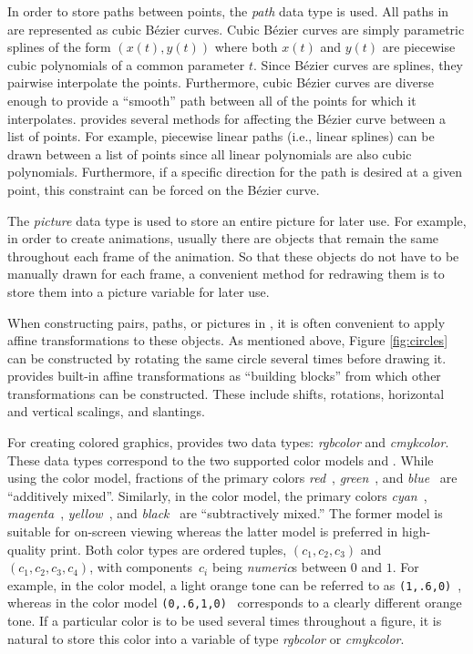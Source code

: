 In order to store paths between points, the \textit{path} data type is
used.  All paths in \MP{} are represented as cubic B\'{e}zier curves.
Cubic B\'{e}zier curves are simply parametric splines of the form
$(x(t),y(t))$ where both $x(t)$ and $y(t)$ are piecewise cubic
polynomials of a common parameter $t$.  Since B\'{e}zier curves are
splines, they pairwise interpolate the points.  Furthermore, cubic
B\'{e}zier curves are diverse enough to provide a ``smooth'' path
between all of the points for which it interpolates.  \MP{} provides
several methods for affecting the B\'{e}zier curve between a list of
points.  For example, piecewise linear paths (i.e., linear splines) can
be drawn between a list of points since all linear polynomials are also
cubic polynomials.  Furthermore, if a specific direction for the path is
desired at a given point, this constraint can be forced on the
B\'{e}zier curve.

The \textit{picture} data type is used to store an entire picture for
later use.  For example, in order to create animations, usually there
are objects that remain the same throughout each frame of the animation.
So that these objects do not have to be manually drawn for each frame, a
convenient method for redrawing them is to store them into a picture
variable for later use.

When constructing pairs, paths, or pictures in \MP{}, it is often
convenient to apply affine transformations to these objects.  As
mentioned above, Figure \ref{fig:circles} can be constructed by rotating
the same circle several times before drawing it.  \MP{} provides
built-in affine transformations as ``building blocks'' from which other
transformations can be constructed.  These include shifts, rotations,
horizontal and vertical scalings, and slantings.

For creating colored graphics, \MP{} provides two data types:
\textit{rgbcolor} and \textit{cmykcolor}.  These data types correspond
to the two supported color models \RGB{} and \CMYK.  While using the
\RGB{} color model, fractions of the primary colors
\textit{red}~, \textit{green}~, and
\textit{blue}~ are ``additively mixed''.  Similarly, in
the \CMYK{} color model, the primary colors
\textit{cyan}~, \textit{magenta}~,
\textit{yellow}~, and \textit{black}~ are
``subtractively mixed.''  The former model is suitable for on-screen
viewing whereas the latter model is preferred in high-quality print.
Both color types are ordered tuples, $(c_1,c_2,c_3)$ and
$(c_1,c_2,c_3,c_4)$, with components~$c_i$ being \textit{numeric}s
between $0$ and $1$.  For example, in the \RGB{} color model, a light
orange tone can be referred to as
\texttt{(1,.6,0)}~, whereas in the \CMYK{} color
model \texttt{(0,.6,1,0)}~ corresponds to a
clearly different orange tone.  If a particular color is to be used
several times throughout a figure, it is natural to store this color
into a variable of type \textit{rgbcolor} or \textit{cmykcolor}.


